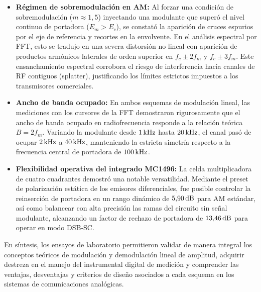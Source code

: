 \begin{itemize}
    \item \textbf{Régimen de sobremodulación en AM:} Al forzar una condición de sobremodulación ($m \approx 1{,}5$)
          inyectando una modulante que superó el nivel continuo de portadora ($E_m > E_c$), se constató la aparición de
          cruces espurios por el eje de referencia y recortes en la envolvente. En el análisis espectral por FFT, esto se
          tradujo en una severa distorsión no lineal con aparición de productos armónicos laterales de orden superior
          en $f_c \pm 2 f_m$ y $f_c \pm 3 f_m$. Este ensanchamiento espectral corrobora el riesgo de interferencia
          hacia canales de RF contiguos (splatter), justificando los límites estrictos impuestos a los transmisores
          comerciales.

    \item \textbf{Ancho de banda ocupado:} En ambos esquemas de modulación lineal, las mediciones con los cursores de
          la FFT demostraron rigurosamente que el ancho de banda ocupado en radiofrecuencia responde a la relación
          teórica $B = 2 f_m$. Variando la modulante desde $1\,\mathrm{kHz}$ hasta $20\,\mathrm{kHz}$, el canal pasó de ocupar $2\,\mathrm{kHz}$
          a $40\,\mathrm{kHz}$, manteniendo la estricta simetría respecto a la frecuencia central de portadora de $100\,\mathrm{kHz}$.

    \item \textbf{Flexibilidad operativa del integrado MC1496:} La celda multiplicadora de cuatro cuadrantes
          demostró una notable versatilidad. Mediante el preset de polarización estática de los emisores diferenciales,
          fue posible controlar la reinserción de portadora en un rango dinámico de $5{,}90\,\mathrm{dB}$ para AM estándar, así
          como balancear con alta precisión las ramas del circuito sin señal modulante, alcanzando un factor de
          rechazo de portadora de $13{,}46\,\mathrm{dB}$ para operar en modo DSB-SC.
\end{itemize}

En síntesis, los ensayos de laboratorio permitieron validar de manera integral los conceptos teóricos de modulación y
demodulación lineal de amplitud, adquirir destreza en el manejo del instrumental digital de medición y comprender las
ventajas, desventajas y criterios de diseño asociados a cada esquema en los sistemas de comunicaciones analógicas.
